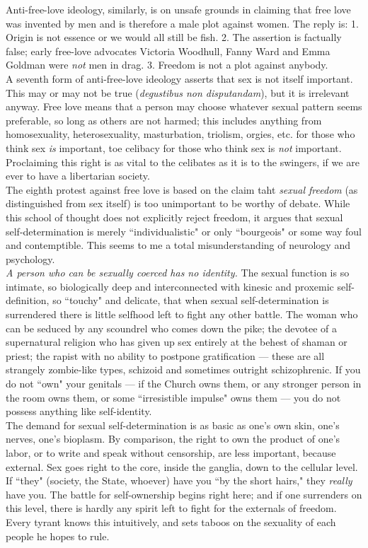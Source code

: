 \documentclass[12pt, onecolumn, letterpaper, oneside]{book}
\begin{document}
Anti-free-love ideology, similarly, is on unsafe grounds in claiming that free love was invented by men and is therefore a male plot against women. The reply is: 1. Origin is not essence or we would all still be fish. 2. The assertion is factually false; early free-love advocates Victoria Woodhull, Fanny Ward and Emma Goldman were \emph{not} men in drag. 3. Freedom is not a plot against anybody.\\
A seventh form of anti-free-love ideology asserts that sex is not itself important. This may or may not be true (\emph{degustibus non disputandam}), but it is irrelevant anyway. Free love means that a person may choose whatever sexual pattern seems preferable, so long as others are not harmed; this includes anything from homosexuality, heterosexuality, masturbation, triolism, orgies, etc. for those who think sex \emph{is} important, toe celibacy for those who think sex is \emph{not} important. Proclaiming this right is as vital to the celibates as it is to the swingers, if we are ever to have a libertarian society.\\
The eighth protest against free love is based on the claim taht \emph{sexual freedom} (as distinguished from sex itself) is too unimportant to be worthy of debate. While this school of thought does not explicitly reject freedom, it argues that sexual self-determination is merely ``individualistic" or only ``bourgeois" or some way foul and contemptible. This seems to me a total misunderstanding of neurology and psychology.\\
\emph{A person who can be sexually coerced has no identity.} The sexual function is so intimate, so biologically deep and interconnected with kinesic and proxemic self-definition, so ``touchy" and delicate, that when sexual self-determination is surrendered there is little selfhood left to fight any other battle. The woman who can be seduced by any scoundrel who comes down the pike; the devotee of a supernatural religion who has given up sex entirely at the behest of shaman or priest; the rapist with no ability to postpone gratification --- these are all strangely zombie-like types, schizoid and sometimes outright schizophrenic. If you do not ``own" your genitals --- if the Church owns them, or any stronger person in the room owns them, or some ``irresistible impulse" owns them --- you do not possess anything like self-identity.\\
The demand for sexual self-determination is as basic as one's own skin, one's nerves, one's bioplasm. By comparison, the right to own the product of one's labor, or to write and speak without censorship, are less important, because external. Sex goes right to the core, inside the ganglia, down to the cellular level. If ``they" (society, the State, whoever) have you ``by the short hairs," they \emph{really} have you. The battle for self-ownership begins right here; and if one surrenders on this level, there is hardly any spirit left to fight for the externals of freedom. Every tyrant knows this intuitively, and sets taboos on the sexuality of each people he hopes to rule.\\
\end{document}
